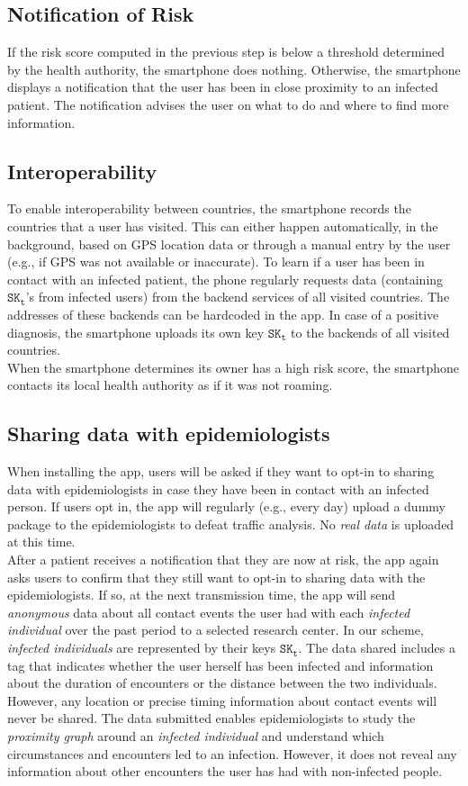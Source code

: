 \documentclass[12pt,a4paper]{article}
\begin{document}
\subsection*{Notification of Risk}
If the risk score computed in the previous step is below a threshold determined by the health authority, the smartphone does nothing. Otherwise, the smartphone displays a notification that the user has been in close proximity to an infected patient. The notification advises the user on what to do and where to find more information.
\subsection*{Interoperability}
To enable interoperability between countries, the smartphone records the countries that a
user has visited. This can either happen automatically, in the background, based on GPS
location data or through a manual entry by the user (e.g., if GPS was not available or
inaccurate). To learn if a user has been in contact with an infected patient, the phone
regularly requests data (containing $\texttt{SK}_\texttt{t}$’s from infected users) from the backend services of all visited countries. The addresses of these backends can be hardcoded in the app. In case of a positive diagnosis, the smartphone uploads its own key $\texttt{SK}_\texttt{t}$ to the backends of all visited countries.\\[0.3cm]
When the smartphone determines its owner has a high risk score, the smartphone contacts
its local health authority as if it was not roaming.
\subsection*{Sharing data with epidemiologists}
When installing the app, users will be asked if they want to opt-in to sharing data with
epidemiologists in case they have been in contact with an infected person. If users opt in, the app will regularly (e.g., every day) upload a dummy package to the epidemiologists to defeat traffic analysis. No \textit{real data}  is uploaded at this time.\\[0.3cm]
After a patient receives a notification that they are now at risk, the app again asks users to confirm that they still want to opt-in to sharing data with the epidemiologists. If so, at the next transmission time, the app will send \textit{anonymous} data about all contact events the user had with each \textit{infected individual} over the past period to a selected research center. In our scheme, \textit{infected individuals} are represented by their keys $\texttt{SK}_\texttt{t}$. The data shared includes a tag that indicates whether the user herself has been infected and information about the duration of encounters or the distance between the two individuals. However, any location or precise timing information about contact events will never be shared. The data submitted enables epidemiologists to study the \textit{proximity graph} around an \textit{infected individual} and understand which circumstances and encounters led to an infection. However, it does not reveal any information about other encounters the user has had with non-infected people.
\end{document}
